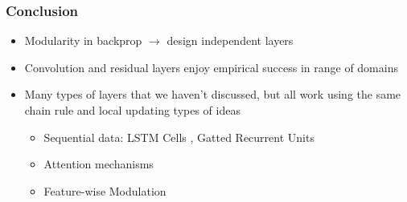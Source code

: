 \documentclass[10pt,mathserif]{beamer}
\begin{document}
\begin{frame}
  \frametitle{Conclusion}
 \begin{itemize}
 \item Modularity in backprop $\rightarrow$ design independent layers
 \item Convolution and residual layers enjoy empirical success in range of
   domains
 \item Many types of layers that we haven't discussed, but all work using the
   same chain rule and local updating types of ideas
   \begin{itemize}
   \item Sequential data: LSTM Cells \citep{schmidhuber1997long}, Gatted
     Recurrent Units \citep{chung2014empirical}
   \item Attention mechanisms \citep{bahdanau2014neural}
   \item Feature-wise Modulation \citep{perez2017film}
   \end{itemize}
 \end{itemize}
\end{frame}

\begin{frame}


\end{frame}
\end{document}
